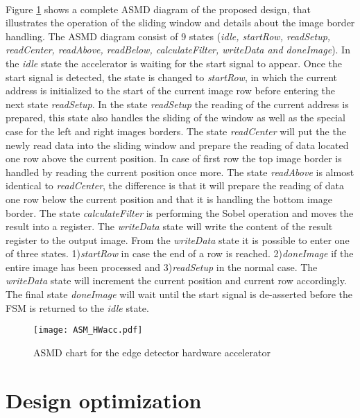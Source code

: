 \paragraph*{}
Figure \ref{fig:ASM_HW} shows a complete ASMD diagram of the proposed design, that illustrates the operation of the sliding window and details about the image border handling. The ASMD diagram consist of 9 states (\emph{idle, startRow, readSetup, readCenter, readAbove, readBelow, calculateFilter, writeData and doneImage}).
In the \emph{idle} state the accelerator is waiting for the start signal to appear. Once the start signal is detected, the state is changed to \emph{startRow}, in which the current address is initialized to the start of the current image row before entering the next state \emph{readSetup}. In the state \emph{readSetup} the reading of the current address is prepared, this state also handles the sliding of the window as well as the special case for the left and right images borders. The state \emph{readCenter} will put the the newly read data into the sliding window and prepare the reading of data located one row above the current position. In case of first row the top image border is handled by reading the current position once more. The state \emph{readAbove} is almost identical to \emph{readCenter}, the difference is that it will prepare the reading of data one row below the current position and that it is handling the bottom image border. The state \emph{calculateFilter} is performing the Sobel operation and moves the result into a register. The \emph{writeData} state will write the content of the result register to the output image. From the \emph{writeData} state it is possible to enter one of three states. 1)\emph{startRow} in case the end of a row is reached. 2)\emph{doneImage} if the entire image has been processed and 3)\emph{readSetup} in the normal case.
The \emph{writeData} state will increment the current position and current row accordingly. The final state \emph{doneImage} will wait until the start signal is de-asserted before the FSM is returned to the \emph{idle} state.


\begin{figure}[H]
	\centering
	\texttt{[image: ASM\_HWacc.pdf]}
	\caption{ASMD chart for the edge detector hardware accelerator}
	\label{fig:ASM_HW}
\end{figure}



\section{Design optimization}
\label{sec:Optimization}
